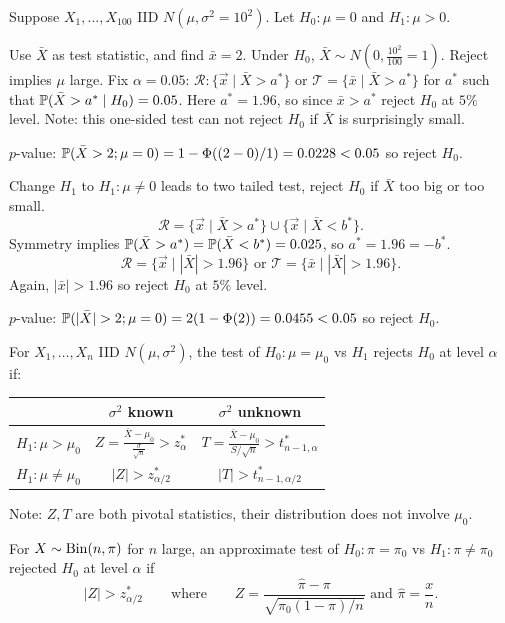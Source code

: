 \documentclass[10pt, a4paper]{article}
\begin{document}
\begin{example}
    Suppose $X_1, \dotsc, X_{100}$ IID $N(\mu, \sigma ^ 2 = 10 ^ 2)$.
    Let $H_0 : \mu = 0$ and $H_1 : \mu > 0$.

    Use $\bar{X}$ as test statistic,
    and find $\bar{x} = 2$.
    Under $H_0$,
    $\bar{X} \sim N\left(0, \frac{10 ^ 2}{100} = 1\right)$.
    Reject implies $\mu$ large.
    Fix $\alpha = 0.05$:
    $\mathcal{R} : \{\vec{x} \mid \bar{X} > a ^ {*}\}$ or $\mathcal{T} = \{\bar{x} \mid \bar{X} > a ^ {*}\}$ for $a ^ {*}$ such that $\P(\bar{X} > a ^ {*}\mid H_0) = 0.05$.
    Here $a ^ {*} = 1.96$,
    so since $\bar{x} > a ^ {*}$ reject $H_0$ at $5\%$ level.
    Note:
    this one-sided test can not reject $H_0$ if $\bar{X}$ is surprisingly small.

    $p$-value:
    $\P(\bar{X} > 2; \mu = 0) = 1 - \Phi((2 - 0) / 1) = 0.0228 < 0.05$ so reject $H_0$.

    Change $H_1$ to $H_1 : \mu \neq 0$ leads to two tailed test,
    reject $H_0$ if $\bar{X}$ too big or too small.
    \[
    \mathcal{R} = \{\vec{x} \mid \bar{X} > a ^ {*}\} \cup \{\vec{x} \mid \bar{X} < b ^ {*}\}.
    \]
    Symmetry implies $\P(\bar{X} > a ^ {*}) = \P(\bar{X} < b ^ {*}) = 0.025$,
    so $a ^ {*} = 1.96 = -b ^ {*}$.
    \[
    \mathcal{R} = \{\vec{x} \mid |\bar{X}| > 1.96\}\text{ or }\mathcal{T} = \{\bar{x} \mid |\bar{X}| > 1.96\}.
    \]
    Again,
    $|\bar{x}| > 1.96$ so reject $H_0$ at $5\%$ level.

    $p$-value:
    $\P(|\bar{X}| > 2; \mu = 0) = 2(1 - \Phi(2)) = 0.0455 < 0.05$ so reject $H_0$.
\end{example}

\begin{proposition}
    For $X_1, \dotsc, X_n$ IID $N(\mu, \sigma ^ 2)$,
    the test of $H_0 : \mu = \mu_0$ vs $H_1$ rejects $H_0$ at level $\alpha$ if:
    \begin{table}[ht]
        \centering
        \begin{tabular}{c|c|c}
            \phantom{}& $\sigma ^ 2$ known & $\sigma ^ 2$ unknown \\
            \hline
             $H_1 : \mu > \mu_0$ & $Z = \frac{\bar{X} - \mu_0}{\frac{\sigma}{\sqrt{n}}} > z_{\alpha} ^ {*}$ & $T = \frac{\bar{X} - \mu_0}{S / \sqrt{n}} > t_{n - 1, \alpha}^{*}$ \\
             $H_1 : \mu \neq \mu_0$ & $|Z| > z_{\alpha / 2}^{*}$ & $|T| > t_{n - 1, \alpha / 2}^{*}$
        \end{tabular}
    \end{table}
    Note:
    $Z, T$ are both pivotal statistics,
    their distribution does not involve $\mu_0$.

    For $X \sim \Bin(n, \pi)$ for $n$ large,
    an approximate test of $H_0 : \pi = \pi_0$ vs $H_1 : \pi \neq \pi_0$ rejected $H_0$ at level $\alpha$ if
    \[
    |Z| > z_{\alpha / 2}^{*}\qquad\text{where}\qquad Z = \frac{\hat{\pi} - \pi}{\sqrt{\pi_0(1 - \pi) / n}}\text{ and } \hat{\pi} = \frac{x}{n}.
    \]
\end{proposition}
\end{document}
